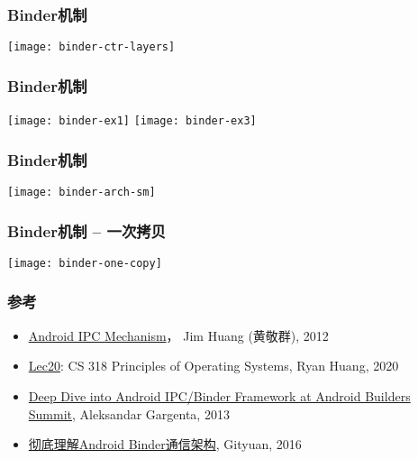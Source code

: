\begin{frame}[plain]
	\frametitle{Binder机制}
	\centering
	\texttt{[image: binder-ctr-layers]}
	
\end{frame}

\begin{frame}[plain]
	\frametitle{Binder机制}
	\centering
	
\texttt{[image: binder-ex1]}
\texttt{[image: binder-ex3]}
	
\end{frame}

\begin{frame}[plain]
	\frametitle{Binder机制 }
	
	\texttt{[image: binder-arch-sm]}
	
\end{frame}
\begin{frame}[plain]
	\frametitle{Binder机制 -- 一次拷贝}

	\texttt{[image: binder-one-copy]}

\end{frame}

\begin{frame}[plain]
	\frametitle{参考}
	
			\begin{itemize}
				\item \href{http://www.dre.vanderbilt.edu/~schmidt/cs282/PDFs/android-binder-ipc.pdf}{Android IPC Mechanism}， Jim Huang (黄敬群), 2012
				\item \href{https://www.cs.jhu.edu/~huang/cs318/fall18/lectures/lec20_mobile_ds.pdf}{Lec20}: CS 318 Principles of Operating Systems, Ryan Huang, 2020			
				\item \href{https://events.static.linuxfound.org/images/stories/slides/abs2013_gargentas.pdf}{Deep Dive into Android IPC/Binder Framework at Android Builders Summit}, Aleksandar Gargenta, 2013				
				\item \href{http://gityuan.com/2016/09/04/binder-start-service/}{彻底理解Android Binder通信架构}, Gityuan, 2016
			\end{itemize}
	
\end{frame}

